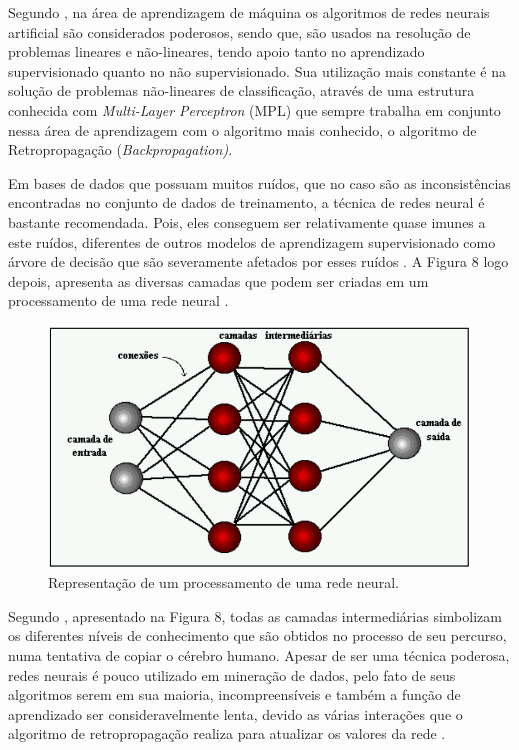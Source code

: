 \par
Segundo \cite{Carvalho2014}, na área de aprendizagem de máquina os algoritmos de redes neurais artificial são considerados poderosos, sendo que, são usados na resolução de problemas lineares e não-lineares, tendo apoio tanto no aprendizado supervisionado quanto no não supervisionado. Sua utilização mais constante é na solução de problemas não-lineares de classificação, através de uma estrutura conhecida com \textit{Multi-Layer Perceptron} (MPL) que sempre trabalha em conjunto nessa área de aprendizagem com o algoritmo mais conhecido, o algoritmo de Retropropagação (\textit{Backpropagation)}.

\par
Em bases de dados que possuam muitos ruídos, que no caso são as inconsistências encontradas no conjunto de dados de treinamento, a técnica de redes neural é bastante recomendada. Pois, eles conseguem ser relativamente quase imunes a este ruídos, diferentes de outros modelos de aprendizagem supervisionado como árvore de decisão que são severamente afetados por esses ruídos \cite{Carvalho2014}. A Figura 8 logo depois, apresenta as diversas camadas que podem ser criadas em um processamento de uma rede neural \cite{Cortes2002}.

\begin{figure}[!htp]
	\begin{center}
    \caption{\label{fig:waveform_fig} Representação de um processamento de uma rede neural.}
	\includegraphics[scale=0.56]{Figuras/Redes_neural.png}
	\end{center}
\end{figure}

\par
Segundo , apresentado na Figura 8, todas as camadas intermediárias simbolizam os diferentes níveis de conhecimento que são obtidos no processo de seu percurso, numa tentativa de copiar o cérebro humano. Apesar de ser uma técnica poderosa, redes neurais é pouco utilizado em mineração de dados, pelo fato de seus algoritmos serem em sua maioria, incompreensíveis e também a função de aprendizado ser consideravelmente lenta, devido as várias interações que o algoritmo de retropropagação realiza para atualizar os valores da rede \cite{Carvalho2014}. 



